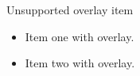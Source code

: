 \documentclass[14pt,t]{beamer-accessibility}
\begin{document}
\begin{frame}{Unsupported overlay item}
\begin{itemize}
\item<1-> Item one with overlay.
\item<2-> Item two with overlay.
\end{itemize}
\end{frame}
\end{document}
